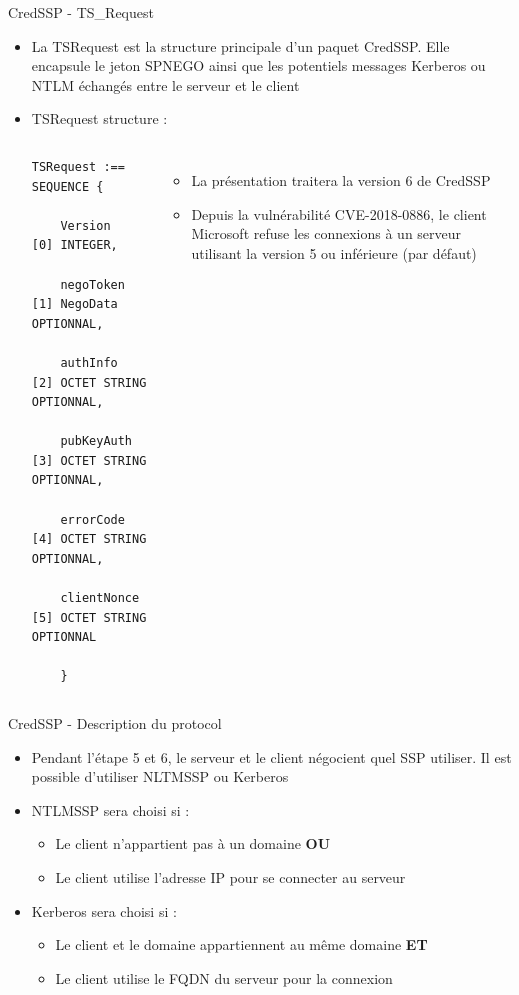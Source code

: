 \documentclass{beamer}
\begin{document}
\begin{frame}[fragile]{CredSSP - TS\_Request}
	\begin{itemize}
		\item La TSRequest est la structure principale d'un paquet CredSSP. Elle encapsule le jeton SPNEGO ainsi que les potentiels messages Kerberos ou NTLM échangés entre le serveur et le client
		\item TSRequest structure :
		\begin{columns}[T]
			\begin{lstlisting}[frame=single,basicstyle=\tiny]
TSRequest :== SEQUENCE {		
	
	Version     [0] INTEGER,
	
	negoToken   [1] NegoData OPTIONNAL,
	
	authInfo    [2] OCTET STRING OPTIONNAL,
	
	pubKeyAuth  [3] OCTET STRING OPTIONNAL,
	
	errorCode   [4] OCTET STRING OPTIONNAL,
	
	clientNonce [5] OCTET STRING OPTIONNAL
	
	}
			\end{lstlisting}
			\begin{itemize}
				\footnotesize \item La présentation traitera la version 6 de CredSSP
				\footnotesize \item Depuis la vulnérabilité CVE-2018-0886, le client Microsoft refuse les connexions à un serveur utilisant la version 5 ou inférieure (par défaut)
			\end{itemize}
		\end{columns}
	\end{itemize}
\end{frame}

\begin{frame}{CredSSP - Description du protocol}
	\begin{itemize}
	\item Pendant l'étape 5 et 6, le serveur et le client négocient quel SSP utiliser. Il est possible d'utiliser NLTMSSP ou Kerberos
	\newline
	
	\item NTLMSSP sera choisi si :
		\begin{itemize}
		\item Le client n'appartient pas à un domaine \textbf{OU}
		\item Le client utilise l'adresse IP pour se connecter au serveur 
		\newline 
		
		\end{itemize}
	\item Kerberos sera choisi si :
		\begin{itemize}
		\item Le client et le domaine appartiennent au même domaine \textbf{ET}
		\item Le client utilise le FQDN du serveur pour la connexion
		\end{itemize}
	\end{itemize}
\end{frame}
\end{document}
